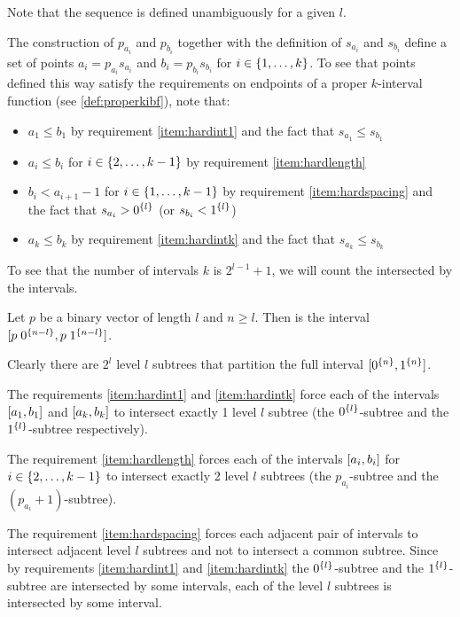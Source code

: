 Note that the sequence is defined unambiguously
for a given $l$.

The construction of $p_{a_i}$ and $p_{b_i}$
together with the definition
of $s_{a_i}$ and $s_{b_i}$ define a set of points
$a_i = p_{a_i} s_{a_i}$ and $b_i = p_{b_i} s_{b_i}$
for $i \in \{1, \ldots, k\}$.
To see that points defined this way
satisfy the requirements on endpoints
of a proper $k$-interval function
(see \autoref{def:properkibf}),
note that:

\begin{itemize}
\item $a_1 \leq b_1$ by requirement \ref{item:hardint1}
and the fact that $s_{a_1} \leq s_{b_1}$
\item $a_i \leq b_i$
for $i \in \{2, \ldots, k-1\}$
by requirement \ref{item:hardlength}
\item $b_i < a_{i+1} - 1$
for $i \in \{1, \ldots, k-1\}$
by requirement \ref{item:hardspacing}
and the fact that $s_{a_i} > 0^{\{l\}}$
(or $s_{b_i} < 1^{\{l\}}$)
\item $a_k \leq b_k$ by requirement \ref{item:hardintk}
and the fact that $s_{a_k} \leq s_{b_k}$
\end{itemize}

To see that the number of intervals $k$ is $2^{l-1} + 1$,
we will count the 
intersected by the intervals.

\begin{definition}[Subtree]
Let $p$ be a binary vector of length $l$
and $n \geq l$.
Then  is the interval
$[p \; 0^{\{n-l\}}, p \; 1^{\{n-l\}}]$.
\end{definition}

Clearly there are $2^l$ level $l$ subtrees
that partition the full interval
$[0^{\{n\}}, 1^{\{n\}}]$.

The requirements
\ref{item:hardint1} and \ref{item:hardintk}
force each of the intervals
$[a_1, b_1]$ and $[a_k, b_k]$
to intersect exactly 1 level $l$ subtree
(the $0^{\{l\}}$-subtree
and the $1^{\{l\}}$-subtree respectively).

The requirement \ref{item:hardlength}
forces each of the intervals
$[a_i, b_i]$ for $i \in \{2, \ldots, k-1\}$
to intersect exactly 2 level $l$ subtrees
(the $p_{a_i}$-subtree and the $(p_{a_i}+1)$-subtree).

The requirement \ref{item:hardspacing}
forces each adjacent pair of intervals
to intersect adjacent level $l$ subtrees
and not to intersect a common subtree.
Since by requirements
\ref{item:hardint1} and \ref{item:hardintk}
the $0^{\{l\}}$-subtree
and the $1^{\{l\}}$-subtree
are intersected by some intervals,
each of the level $l$ subtrees is intersected
by some interval.

